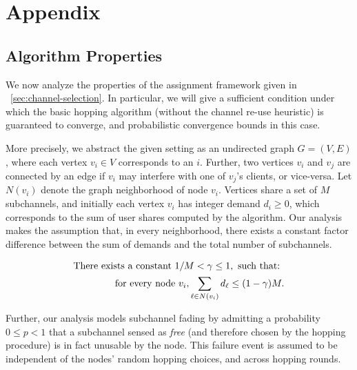 \appendix

\section{Appendix}


\subsection{Algorithm Properties}
\label{sec:proof}


We now analyze the properties of the assignment framework given in ~\ref{sec:channel-selection}. 
In particular, we will give a sufficient condition under which the basic hopping algorithm 
(without the channel re-use heuristic) is guaranteed to converge, 
and probabilistic convergence bounds in this case. 

More precisely, we abstract the given setting as an undirected graph $G = (V, E)$, where each vertex $v_i \in V$ corresponds to an \eNB $i$. 
Further, two vertices $v_i$ and $v_j$ are connected by an edge if $v_i$ may interfere with one of $v_j$'s clients, or vice-versa. 
Let $N(v_i)$ denote the graph neighborhood of node $v_i$. 
Vertices share a set of $M$ subchannels, and initially each vertex $v_i$ has integer demand $d_i \geq 0$, which corresponds to the sum of user shares computed by the algorithm. 
Our analysis makes the assumption that, in every neighborhood, there exists a constant factor difference between the sum of demands and the total number of  subchannels.

\begin{eqnarray*}
  \textnormal{There exists a constant } 1 / M < \gamma \leq 1, \textnormal{ such that: } \\ \textnormal{ for every node }  v_i, \sum_{\ell \in N(v_i)} d_\ell \leq (1 - \gamma) M.
\end{eqnarray*}

Further, our analysis models subchannel fading by admitting a probability $0 \leq p < 1$ that a subchannel sensed as \emph{free} (and therefore chosen by the hopping procedure) is in fact unusable by the node. 
This failure event is assumed to be independent of the nodes' random hopping choices, and across hopping rounds. 

